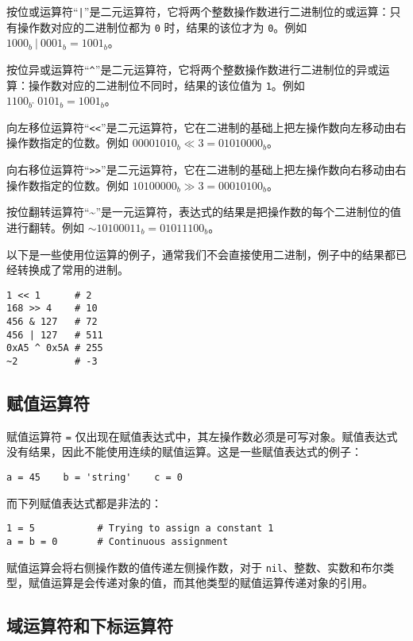 按位或运算符``\texttt{|}''是二元运算符，它将两个整数操作数进行二进制位的或运算：只有操作数对应的二进制位都为 \texttt{0} 时，结果的该位才为 \texttt{0}。例如 $1000_b\ |\ 0001_b = 1001_b$。

按位异或运算符``\texttt{\textasciicircum}''是二元运算符，它将两个整数操作数进行二进制位的异或运算：操作数对应的二进制位不同时，结果的该位值为 \texttt{1}。例如 $1100_b\ \hat{}\ 0101_b = 1001_b$。

向左移位运算符``\texttt{<<}''是二元运算符，它在二进制的基础上把左操作数向左移动由右操作数指定的位数。例如 $00001010_b \ll 3 = 01010000_b$。

向右移位运算符``\texttt{>>}''是二元运算符，它在二进制的基础上把左操作数向右移动由右操作数指定的位数。例如 $10100000_b \gg 3 = 00010100_b$。

按位翻转运算符``\textasciitilde''是一元运算符，表达式的结果是把操作数的每个二进制位的值进行翻转。例如 $\mathtt{\sim}10100011_b = 01011100_b$。

以下是一些使用位运算的例子，通常我们不会直接使用二进制，例子中的结果都已经转换成了常用的进制。
\begin{lstlisting}[language=berry, numbers=none]
1 << 1      # 2
168 >> 4    # 10
456 & 127   # 72
456 | 127   # 511
0xA5 ^ 0x5A # 255
~2          # -3
\end{lstlisting}

\subsection{赋值运算符} \label{section::assign_operator}

赋值运算符 \texttt{=} 仅出现在赋值表达式中，其左操作数必须是可写对象。赋值表达式没有结果，因此不能使用连续的赋值运算。这是一些赋值表达式的例子：
\begin{lstlisting}[language=berry, numbers=none]
a = 45    b = 'string'    c = 0
\end{lstlisting}
而下列赋值表达式都是非法的：
\begin{lstlisting}[language=berry, numbers=none]
1 = 5           # Trying to assign a constant 1
a = b = 0       # Continuous assignment
\end{lstlisting}

赋值运算会将右侧操作数的值传递左侧操作数，对于 \texttt{nil}、整数、实数和布尔类型，赋值运算是会传递对象的值，而其他类型的赋值运算传递对象的引用。

\subsection{域运算符和下标运算符}

